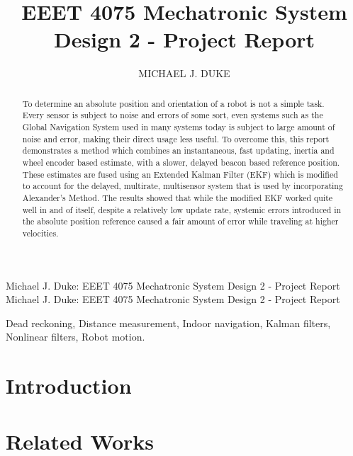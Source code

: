 \documentclass{ieeeaccess}
\begin{document}

\title{EEET 4075 Mechatronic System Design 2 - Project Report}
\author{\uppercase{Michael J. Duke}}
\address[1]{University of South Australia, Mawson Lakes, SA 5095 Australia (e-mail: dukmj002@mymail.unisa.edu.au)}

\markboth
{Michael J. Duke: EEET 4075 Mechatronic System Design 2 - Project Report}
{Michael J. Duke: EEET 4075 Mechatronic System Design 2 - Project Report}

\begin{abstract}
To determine an absolute position and orientation of a robot is not a simple task. Every sensor is subject to noise and errors of some sort, even systems such as the Global Navigation System used in many systems today is subject to large amount of noise and error, making their direct usage less useful. To overcome this, this report demonstrates a method which combines an instantaneous, fast updating, inertia and wheel encoder based estimate, with a slower, delayed beacon based reference position. These estimates are fused using an Extended Kalman Filter (EKF) which is modified to account for the delayed, multirate, multisensor system that is used by incorporating Alexander's Method. The results showed that while the modified EKF worked quite well in and of itself, despite a relatively low update rate, systemic errors introduced in the absolute position reference caused a fair amount of error while traveling at higher velocities.
\end{abstract}

\begin{keywords}
Dead reckoning, Distance measurement, Indoor navigation, Kalman filters, Nonlinear filters, Robot motion.
\end{keywords}

\titlepgskip=-15pt

\maketitle

\section{Introduction}
\label{sec:introduction}
	

\section{Related Works}
\label{sec:rel}
	
\end{document}
